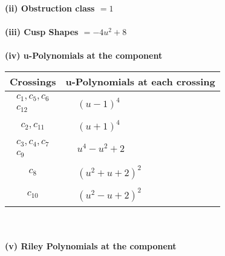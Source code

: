 \documentclass[1p]{elsarticle_modified}
\theoremstyle{definition}
\begin{document}
\flushleft \textbf{(ii) Obstruction class $= 1$}\\~\\
\flushleft \textbf{(iii) Cusp Shapes $= -4 u^2+8$}\\~\\
\newpage\renewcommand{\arraystretch}{1}
\flushleft \textbf{(iv) u-Polynomials at the component}\newline \\
\begin{tabular}{m{50pt}|m{274pt}}
Crossings & \hspace{64pt}u-Polynomials at each crossing \\
\hline $$\begin{aligned}c_{1},c_{5},c_{6}\\c_{12}\end{aligned}$$&$\begin{aligned}
&(u-1)^4
\end{aligned}$\\
\hline $$\begin{aligned}c_{2},c_{11}\end{aligned}$$&$\begin{aligned}
&(u+1)^4
\end{aligned}$\\
\hline $$\begin{aligned}c_{3},c_{4},c_{7}\\c_{9}\end{aligned}$$&$\begin{aligned}
&u^4- u^2+2
\end{aligned}$\\
\hline $$\begin{aligned}c_{8}\end{aligned}$$&$\begin{aligned}
&(u^2+u+2)^2
\end{aligned}$\\
\hline $$\begin{aligned}c_{10}\end{aligned}$$&$\begin{aligned}
&(u^2- u+2)^2
\end{aligned}$\\
\hline
\end{tabular}\\~\\
\newpage\renewcommand{\arraystretch}{1}
\flushleft \textbf{(v) Riley Polynomials at the component}\newline \\
\end{document}
